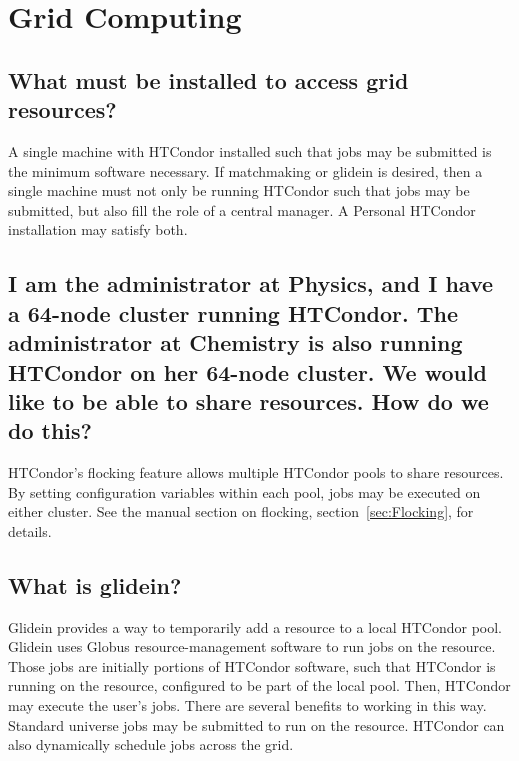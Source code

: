 \section{Grid Computing}


\subsection*{What must be installed to access grid resources?}
A single machine with HTCondor installed such that jobs may
be submitted is the minimum software necessary.
If matchmaking or glidein is desired,
then a single machine must not only be running HTCondor
such that jobs may be submitted,
but also fill the role of a central manager.
A Personal HTCondor installation may satisfy both.

\subsection*{I am the administrator at Physics, and I have a 64-node cluster
running HTCondor.
The administrator at Chemistry is also running HTCondor on her 64-node cluster.
We would like to be able to share resources.
How do we do this?}

HTCondor's flocking feature
allows multiple HTCondor pools to share resources.
By setting configuration variables within each pool,
jobs may be executed on either cluster.
See the manual section on flocking, section~\ref{sec:Flocking},
for details.

\subsection*{What is glidein?}

Glidein provides a way to temporarily add a resource
to a local HTCondor pool.
Glidein uses Globus resource-management software to run jobs
on the resource.
Those jobs are initially portions of HTCondor
software, such that HTCondor is running on the resource,
configured to be part of the local pool.
Then, HTCondor may execute the user's jobs.
There are several benefits to working in this way.
Standard universe jobs may be submitted to run on the resource.
HTCondor can also dynamically schedule jobs across the grid.

